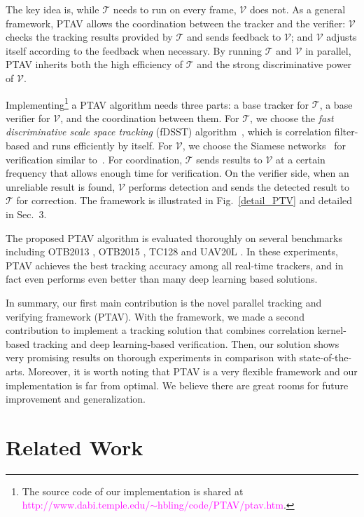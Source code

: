 \documentclass[10pt,twocolumn,letterpaper]{article}
\def \TRK{\mathcal{T}}
\def \VRF{\mathcal{V}}
\def \VF{\mathcal{V}}
\begin{document}
The key idea is, while $\TRK$ needs to run on every frame, $\VRF$ does not. As a general framework, PTAV allows the coordination between the tracker and the verifier: $\VRF$ checks the tracking results provided by $\TRK$ and sends feedback to $\VRF$; and $\VRF$ adjusts itself according to the feedback when necessary. By running $\TRK$ and $\VRF$ in parallel, PTAV inherits both the high efficiency of $\TRK$ and the strong discriminative power of $\VRF$.

Implementing\footnote{The source code of our implementation is shared at
\textcolor{magenta}{http://www.dabi.temple.edu/$\sim$hbling/code/PTAV/ptav.htm}.} a PTAV algorithm needs three parts: a base tracker for $\TRK$, a base verifier for $\VRF$, and the coordination between them. For $\TRK$, we choose the \emph{fast discriminative scale space tracking} (fDSST) algorithm~\cite{danelljan2016discriminative}, which is correlation filter-based and runs efficiently by itself. For $\VRF$, we choose the Siamese networks~\cite{chopra2005learning} for verification similar to~\cite{tao2016siamese}. For coordination, $\TRK$ sends results to $\VRF$ at a certain frequency that allows enough time for verification. On the verifier side, when an unreliable result is found, $\VF$ performs detection and sends the detected result to $\TRK$ for correction. The framework is illustrated in Fig.~\ref{detail_PTV} and detailed in Sec.~3.

The proposed PTAV algorithm is evaluated thoroughly on several benchmarks including OTB2013 \cite{wu2013online}, OTB2015 \cite{wu2015object}, TC128 \cite{liang2015encoding} and UAV20L \cite{mueller2016benchmark}. In these experiments, PTAV achieves the best tracking accuracy among all real-time trackers, and in fact even performs even better than many deep learning based solutions.

In summary, our first main contribution is the novel parallel tracking and verifying framework (\ie PTAV). With the framework, we made a second contribution to implement a tracking solution that combines correlation kernel-based tracking and deep learning-based verification. Then, our solution shows very promising results on thorough experiments in comparison with state-of-the-arts. Moreover, it is worth noting that PTAV is a very flexible framework and our implementation is far from optimal. We believe there are great rooms for future improvement and generalization.

\section{Related Work}
\end{document}
